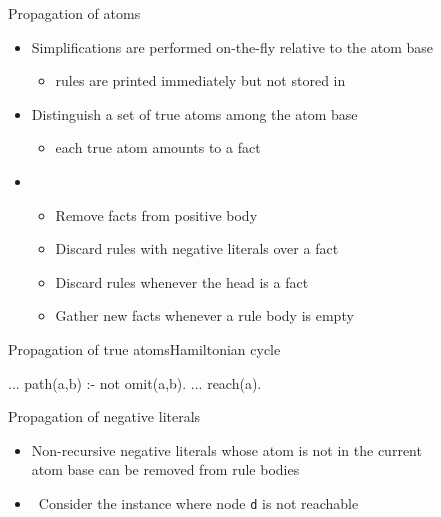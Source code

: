 \begin{frame}{Propagation of atoms}
  \bigskip
  \begin{itemize}
  \item Simplifications are performed \alert{on-the-fly} relative to the atom base
    \begin{itemize}\normalsize
    \item [\itarrow] rules are printed immediately but not stored in \gringo
    \end{itemize}
    \medskip
  \item<2-> Distinguish a set of \alert{true atoms} among the atom base
    \begin{itemize}\normalsize
    \item [\itarrow] each true atom amounts to a fact
    \end{itemize}
    \medskip
  \item<3-> 
    \begin{itemize}\normalsize
    \item Remove facts from positive body
      \smallskip
    \item Discard rules with negative literals over a fact
      \smallskip
    \item Discard rules whenever the head is a fact
      \smallskip
    \item Gather new facts whenever a rule body is empty
    \end{itemize}
  \end{itemize}
\end{frame}
\begin{frame}[fragile]{Propagation of true atoms}{Hamiltonian cycle}
  \bigskip
  \begin{SemiVerbatim}{.9}
...
path(a,b) :- not omit(a,b).
...
reach(a). {}
\end{SemiVerbatim}
\end{frame}
\begin{frame}{Propagation of negative literals}
  \bigskip
  \begin{itemize}
  \item \alert{Non-recursive negative literals} whose atom is not in the current
    \\ atom base can be removed from rule bodies
    \medskip
  \item {} \ Consider the instance where node \texttt{d} is not reachable
  \end{itemize}
  \bigskip
  \begin{center}
    \Graph[draw=none]
  \end{center}
\end{frame}
